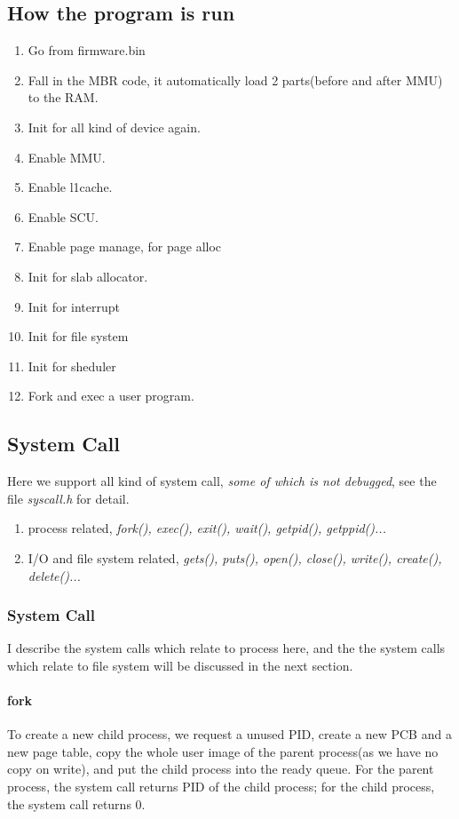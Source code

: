 \documentclass[12pt]{article}
\begin{document}
\subsection{How the program is run}
\begin{enumerate}
	\item	Go from firmware.bin
	\item	Fall in the MBR code, it automatically load 2 parts(before and after MMU) to the RAM.
	\item Init for all kind of device again.
	\item Enable MMU.
	\item	Enable l1cache.
	\item	Enable SCU.
	\item	Enable page manage, for page alloc
	\item	Init for slab allocator.
	\item	Init for interrupt
	\item	Init for file system
	\item Init for sheduler
	\item	Fork and exec a user program.
\end{enumerate}

\subsection{System Call}
Here we support all kind of system call, \emph{some of which is not debugged}, see the file \emph{syscall.h} for detail.

\begin{enumerate}
	\item	process related, \emph{fork(), exec(), exit(), wait(), getpid(), getppid()...}
	\item I/O and file system related, \emph{gets(), puts(), open(), close(), write(), create(), delete()...}
\end{enumerate}


\subsubsection{System Call}
I describe the system calls which relate to process here, and the the system calls which relate to file system will be discussed in the next section.

\paragraph{fork}
To create a new child process, we request a unused PID, create a new PCB and a new page table, copy the whole user image of the parent process(as we have no copy on write), and put the child process into the ready queue. For the parent process, the system call returns PID of the child process; for the child process, the system call returns 0.
\end{document}
